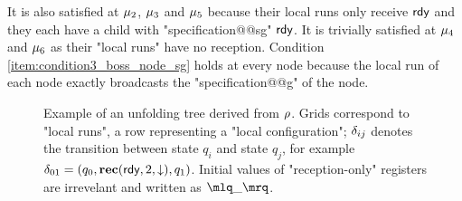 \begin{example}
	It is also satisfied at $\mu_2$, $\mu_3$ and $\mu_5$ because their local runs only receive $\textsf{rdy}$ and they each have a child with "specification@@sg" $\textsf{rdy}$. 
	It is trivially satisfied at $\mu_4$ and $\mu_6$ as their "local runs" have no reception. 
	Condition \ref{item:condition3_boss_node_sg} holds at every node because the local run of each node exactly broadcasts the "specification@@g" of the node. 
\end{example}


\begin{figure}[t]
	\centering
	
	\vspace{-0.5cm}
	\caption{Example of an unfolding tree derived from $\rho$. Grids correspond to "local runs", a row representing a "local configuration"; $\delta_{ij}$ denotes the transition between state $q_i$ and state $q_j$, for example $\delta_{01} = (q_0, \textbf{rec}(\textsf{rdy}, 2, \downarrow), q_1)$. Initial values of "reception-only" registers are irrevelant and written as $\quotemarks{\_}$.}
	\label{fig:unfolding-tree-sign}\label{fig:ex-unfolding-tree-signature}
\end{figure}

